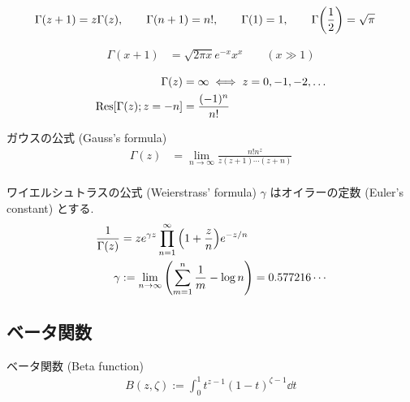 \documentclass[uplatex,dvipdfmx,a4paper,11pt]{jlreq}
\theoremstyle{definition}
\begin{document}
\begin{proposition}
  \begin{align}
    \Gamma(z + 1) & = z\Gamma(z), \qquad \Gamma(n + 1) = n!, \qquad \Gamma(1)= 1, \qquad \Gamma\qty(\frac{1}{2}) = \sqrt{\pi}
  \end{align}
\end{proposition}

\begin{proposition}
  \begin{align}
    \Gamma(x + 1) & = \sqrt{2\pi x}e^{-x}x^x \qquad (x \gg 1)
  \end{align}
\end{proposition}

\begin{proposition}[ガンマ関数の特異点]
  \begin{align}
    \Gamma(z)               & = \infty \iff z = 0, -1, -2, \ldots \\
    \Res[\Gamma(z); z = -n] & = \frac{(-1)^n}{n!}
  \end{align}
\end{proposition}

\begin{proposition}
  ガウスの公式 (Gauss's formula)
  \begin{align}
    \Gamma(z) & = \lim_{n\to\infty}\frac{n!n^z}{z(z+1)\cdots(z+n)} \\
  \end{align}
\end{proposition}
\begin{proposition}
  ワイエルシュトラスの公式 (Weierstrass' formula) $\gamma$ はオイラーの定数 (Euler's constant) とする.
  \begin{align}
    \frac{1}{\Gamma(z)} & = ze^{\gamma z}\prod_{n=1}^{\infty}\qty(1 + \frac{z}{n})e^{-z/n}              \\
    \gamma              & := \lim_{n\to\infty}\qty(\sum_{m=1}^{n}\frac{1}{m} - \log n) = 0.577216\cdots
  \end{align}
\end{proposition}

\subsection{ベータ関数}
\begin{definition}
  ベータ関数 (Beta function)
  \begin{align}
    B(z, \zeta) := \int_{0}^{1}t^{z-1}(1-t)^{\zeta-1}\dd{t}
  \end{align}
\end{definition}
\end{document}
